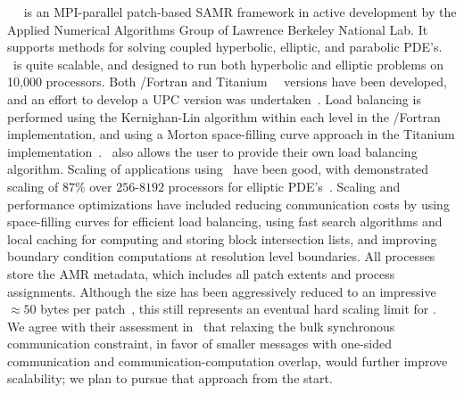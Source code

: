 \documentclass[11pt,letterpaper]{article}
\begin{document}
\SUBSUBSECTION{\chombo} 
%
\chombo~\cite{wwwchombo}~\cite{CoGr09} is an MPI-parallel patch-based
SAMR framework in active development by the Applied Numerical
Algorithms Group of Lawrence Berkeley National Lab.  It supports
methods for solving coupled hyperbolic, elliptic, and parabolic PDE's.
\chombo\ is quite scalable, and designed to run both hyperbolic and
elliptic problems on 10,000 processors.  Both \cpp/Fortran and
Titanium~\cite{wwwtitanium}~\cite{YeSe98} versions have been
developed, and an effort to develop a UPC version was
undertaken~\cite{We04}.  Load balancing is performed using the
Kernighan-Lin algorithm within each level in the \cpp/Fortran
implementation, and using a Morton space-filling curve approach in the
Titanium implementation~\cite{WeSu07}.  \chombo\ also allows the user
to provide their own load balancing algorithm.  Scaling of
applications using \chombo\ have been good, with demonstrated scaling
of $87\%$ over $256$-$8192$ processors for elliptic
PDE's~\cite{CoBe07}.  Scaling and performance optimizations have
included reducing communication costs by using space-filling curves
for efficient load balancing, using fast search algorithms and local
caching for computing and storing block intersection lists, and
improving boundary condition computations at resolution level
boundaries.  All processes store the AMR metadata, which includes all
patch extents and process assignments.  Although the size has been
aggressively reduced to an impressive $\approx 50$ bytes per
patch~\cite{CoBe07}, this still represents an eventual hard scaling
limit for \chombo.  We agree with their assessment in~\cite{WeSu07}
that relaxing the bulk synchronous communication constraint, in favor
of smaller messages with one-sided communication and
communication-computation overlap, would further improve scalability;
we plan to pursue that approach from the start.

\end{document}
